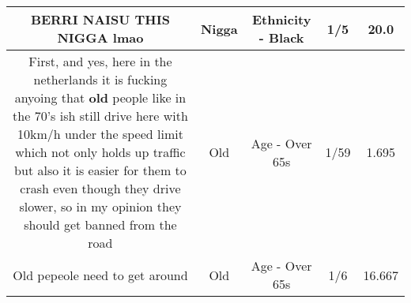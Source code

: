 \documentclass[11pt]{article}
\newlength\mylength
\begin{document}
\begin{center}
\begin{longtable}{|C{.65\mylength}|C{.30\mylength}|C{.12\mylength}|C{.12\mylength}|C{.12\mylength}|}
  \small BERRI NAISU THIS \textbf{NIGGA} lmao\normalsize   & Nigga & Ethnicity - Black & 1/5 & 20.0 \\  \hline
  \small First, and yes, here in the netherlands it is fucking anyoing that \textbf{old} people like in the 70's ish still drive here with 10km/h under the speed limit which not only holds up traffic but also it is easier for them to crash even though they drive slower, so in my opinion they should get banned from the road\normalsize   & Old & Age - Over 65s & 1/59 & 1.695 \\  \hline
  \small Old pepeole need to get around\normalsize   & Old & Age - Over 65s & 1/6 & 16.667 \\  \hline
  
\end{longtable}
\end{center}
\end{document}
